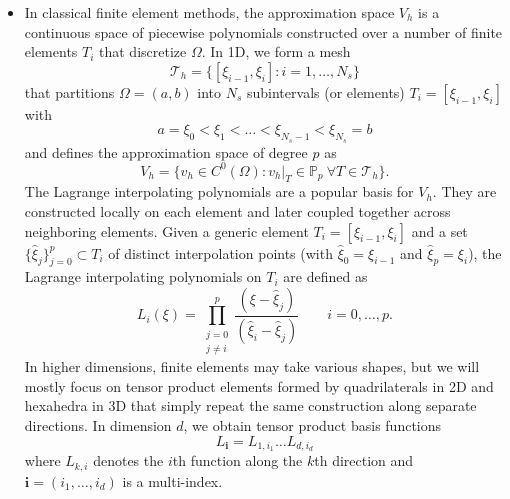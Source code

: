 \documentclass{article}
\numberwithin{equation}{section}
\theoremstyle{definition}
\begin{document}
\begin{itemize}
    \item In classical finite element methods, the approximation space $V_h$ is a continuous space of piecewise polynomials constructed over a number of finite elements $T_i$ that discretize $\Omega$. In 1D, we form a mesh 
    \begin{equation*}
        \mathcal{T}_h = \{[\xi_{i-1},\xi_{i}] \colon i = 1,\dots,N_s\}
    \end{equation*}
    that partitions $\Omega=(a,b)$ into $N_s$ subintervals (or elements) $T_i=[\xi_{i-1},\xi_{i}]$ with
    \begin{equation*}
        a=\xi_0 < \xi_1 < \dots < \xi_{N_s-1} < \xi_{N_s} = b
    \end{equation*}
    and defines the approximation space of degree $p$ as
    \begin{equation*}
        V_h = \{v_h \in C^0(\Omega)\colon v_h|_{T} \in \mathbb{P}_p \ \forall T \in \mathcal{T}_h\}.
    \end{equation*}
    The Lagrange interpolating polynomials are a popular basis for $V_h$. They are constructed locally on each element and later coupled together across neighboring elements. Given a generic element $T_i=[\xi_{i-1},\xi_{i}]$ and a set $\{\hat{\xi}_j\}_{j=0}^p \subset T_i$ of distinct interpolation points (with $\hat{\xi}_0=\xi_{i-1}$ and $\hat{\xi}_p = \xi_{i}$), the Lagrange interpolating polynomials on $T_i$ are defined as
    \begin{equation}
    \label{eq: lagrange_polynomials}
        L_i(\xi) = \prod_{\substack{j=0 \\ j \neq i}}^p \frac{(\xi-\hat{\xi}_j)}{(\hat{\xi}_i - \hat{\xi}_j)} \qquad i=0,\dots,p.
    \end{equation}
    In higher dimensions, finite elements may take various shapes, but we will mostly focus on tensor product elements formed by quadrilaterals in 2D and hexahedra in 3D that simply repeat the same construction along separate directions. In dimension $d$, we obtain tensor product basis functions
    \begin{equation*}
        L_{\bm{i}}=L_{1,i_1} \dots L_{d,i_d}
    \end{equation*}
    where $L_{k,i}$ denotes the $i$th function along the $k$th direction and $\bm{i}=(i_1,\dots,i_d)$ is a multi-index. 


\end{itemize}
\end{document}
